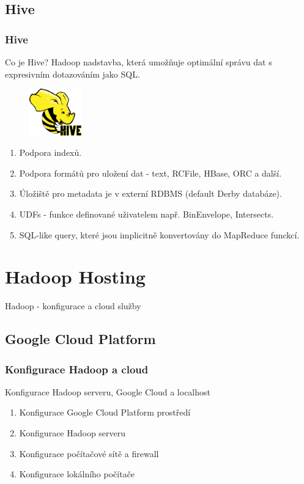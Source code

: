 \documentclass[unicode,bookmarksnumbered]{beamer}
\begin{document}
	\subsection{Hive}
	\begin{frame}
		\frametitle{Hive}
		Co je Hive? Hadoop nadstavba, která umožňuje optimální správu dat s
expresivním dotazováním jako SQL.
				\begin{figure}
					\centering
					\includegraphics[width=0.2\textwidth]{./img/spatial/hive.png}
				\end{figure}
		\begin{enumerate}
			\item Podpora indexů.
			\item Podpora formátů pro uložení dat - text, RCFile, HBase, ORC a další.
			\item Úložiště pro metadata je v externí RDBMS (default Derby databáze).
			\item UDFs - funkce definované uživatelem např. BinEnvelope, Intersects.
			\item SQL-like query, které jsou implicitně konvertovány do MapReduce funckcí.
		\end{enumerate}
	\end{frame}

	
	\section{Hadoop Hosting}
	\begin{frame}[c]
		\begin{center}	
		\Huge Hadoop - konfigurace a cloud služby
		\end{center}
	\end{frame}
	
	
	\subsection{Google Cloud Platform}
	\begin{frame}
		\frametitle{Konfigurace Hadoop a cloud}
		Konfigurace Hadoop serveru, Google Cloud a localhost
		\begin{enumerate}
		\item Konfigurace Google Cloud Platform prostředí
		\item Konfigurace Hadoop serveru
		\item Konfigurace počítačové sítě a firewall
		\item Konfigurace lokálního počítače
		\end{enumerate}
	\end{frame}
	
\end{document}
